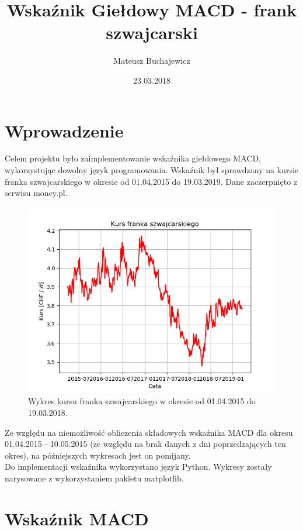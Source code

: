 \documentclass{article} %
\title{Wskaźnik Giełdowy MACD - frank szwajcarski}
\date{23.03.2018}
\author{Mateusz Buchajewicz}
\begin{document}
\maketitle
\section{Wprowadzenie}
Celem projektu było zaimplementowanie wskaźnika giełdowego MACD, wykorzystując dowolny język programowania.
Wskaźnik był sprawdzany na kursie franka szwajcarskiego w okresie od 01.04.2015 do 19.03.2019. 
Dane zaczerpnięto z serwisu money.pl. \\

\begin{figure}[h]
    \centering
    \includegraphics[scale=0.7]{wykres_kursu}
    \caption{Wykres kursu franka szwajcarskiego w okresie od 01.04.2015 do 19.03.2018.}
\end{figure} 

Ze względu na niemożliwość obliczenia składowych wskaźnika MACD dla okresu 01.04.2015 - 10.05.2015
(ze względu na brak danych z dni poprzedzających ten okres), na późniejszych wykresach jest on pomijany. \\

Do implementacji wskaźnika wykorzystano język Python. Wykresy zostały narysowane z wykorzystaniem pakietu matplotlib.




\newpage

\section{Wskaźnik MACD}
\end{document}
